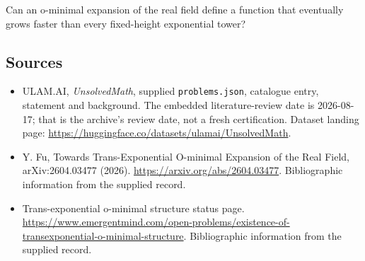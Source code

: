 \documentclass[11pt,a4paper]{article}
\begin{document}
Can an o-minimal expansion of the real field define a function that eventually grows faster than every fixed-height exponential tower?

\subsection{Sources}

{\small

\begin{itemize}

\item[\hypertarget{source:statement:1}{S1}] ULAM.AI, \emph{UnsolvedMath}, supplied \texttt{problems.json}, catalogue entry, statement and background. The embedded literature-review date is 2026-08-17; that is the archive’s review date, not a fresh certification. Dataset landing page: \url{https://huggingface.co/datasets/ulamai/UnsolvedMath}.

\item[\hypertarget{source:statement:2}{S2}] Y. Fu, Towards Trans-Exponential O-minimal Expansion of the Real Field, arXiv:2604.03477 (2026). \url{https://arxiv.org/abs/2604.03477}. Bibliographic information from the supplied record.

\item[\hypertarget{source:statement:3}{S3}] Trans-exponential o-minimal structure status page. \url{https://www.emergentmind.com/open-problems/existence-of-transexponential-o-minimal-structure}. Bibliographic information from the supplied record.

\end{itemize}

}

\label{end:statement}
\end{document}
